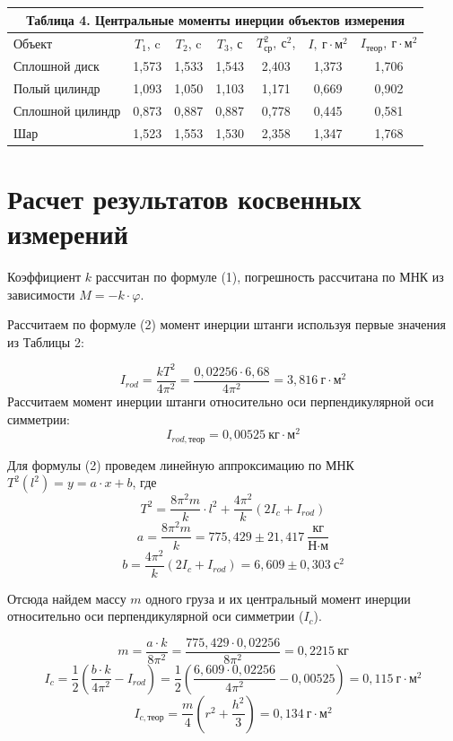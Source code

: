 \documentclass[a4paper,14pt]{article}
\begin{document}
\begin{center}
	\begin{tabular}{|p{6.89em}|c|c|c|c|c|c|}
		\multicolumn{7}{c}{Таблица 4. Центральные моменты инерции объектов измерения} \bigstrut[b]\\
		\hline
		\multicolumn{1}{|l|}{Объект } & $T_{1}$, c & $T_{2}$, c & $T_{3}$, с & $T_{\text{ср}}^2, \ \text{с}^2$,  & $I,\ \text{г}\cdot\text{м}^2$ & $I_{\text{теор}},\ \text{г}\cdot\text{м}^2$ \bigstrut\\
		\hline
		Сплошной диск & 1,573 & 1,533 & 1,543 & 2,403 & 1,373 & 1,706 \bigstrut\\
		\hline
		Полый цилиндр & 1,093 & 1,050 & 1,103 & 1,171 & 0,669 & 0,902 \bigstrut\\
		\hline
		Сплошной цилиндр & 0,873 & 0,887 & 0,887 & 0,778 & 0,445 & 0,581 \bigstrut\\
		\hline
		Шар   & 1,523 & 1,553 & 1,530 & 2,358 & 1,347 & 1,768 \bigstrut\\
		\hline
	\end{tabular}%
\end{center}


\section{Расчет результатов косвенных измерений}

Коэффициент $k$ рассчитан по формуле (1), погрешность рассчитана по МНК из зависимости $M = -k\cdot \varphi$.

Рассчитаем по формуле (2) момент инерции штанги используя первые значения из Таблицы 2:

\[I_{rod} = \frac{kT^2}{4\pi^2} = \frac{0,02256\cdot6,68}{4\pi^2} = 3,816 \ \text{г}\cdot\text{м}^2\]
Рассчитаем момент инерции штанги относительно оси перпендикулярной оси симметрии:
\[I_{rod, \text{теор}} = 0,00525 \ \text{кг}\cdot\text{м}^2\]

Для формулы (2) проведем линейную аппроксимацию по МНК $T^2(l^2) = y = a\cdot x + b$, где
\[T^2 = \frac{8\pi^2m}{k}\cdot l^2 + \frac{4\pi^2}{k}(2I_{c} + I_{rod})\]
\[a = \frac{8\pi^2m}{k} = 775,429 \pm 21,417 \ \frac{\text{кг}}{\text{Н}\cdot\text{м}} \]
\[b = \frac{4\pi^2}{k}(2I_{c} + I_{rod}) = 6,609 \pm 0,303 \ \text{с}^2\]

Отсюда найдем массу $m$ одного груза и их центральный момент инерции относительно оси перпендикулярной оси симметрии ($I_{c}$).

\[m = \frac{a\cdot k}{8\pi^2} = \frac{775,429\cdot 0,02256}{8\pi^2} = 0,2215 \ \text{кг}\]
\[I_{c} = \frac{1}{2} \left(\frac{b\cdot k}{4\pi^2} - I_{rod}\right) = \frac{1}{2} \left(\frac{6,609\cdot 0,02256}{4\pi^2} - 0,00525\right) = 0,115 \ \text{г}\cdot\text{м}^2\]
\[I_{c, \text{теор}} = \frac{m}{4}\left(r^2 + \frac{h^2}{3}\right) = 0,134 \ \text{г}\cdot\text{м}^2\]
\end{document}
